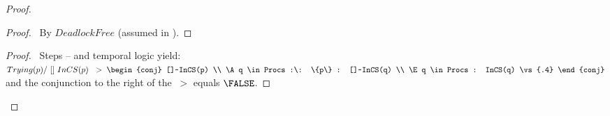 \documentclass[fleqn,leqno]{article}
\begin{document}
\begin{proof}
\begin{proof}
\pf\ By $DeadlockFree$ (assumed in ).
\end{proof} 

\newpage

\qedstep
\begin{proof}
\pf\ Steps -- and temporal logic yield:
   $
    Trying(p) /\ []~InCS(p) \;~>\; 
       \begin{conj}
         []~InCS(p) \\
         \A q \in Procs :\: \{p\} : []~InCS(q) \\
         \E q \in Procs : InCS(q) \vs{.4} 
       \end{conj}
  $\\
and the conjunction to the right of the $~>$ equals $\FALSE$.
\end{proof}
\end{proof}
\end{document}

